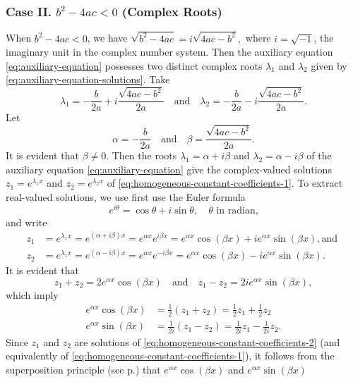  \subsubsection{Case II. \(b^2-4ac<0\) (Complex Roots)}
 When \(b^2-4ac<0\), we have \(\sqrt{b^2-4ac}= i\sqrt{4ac-b^2},\) where $i = \sqrt{-1}$,  the imaginary unit in the complex number system. Then the auxiliary equation \eqref{eq:auxiliary-equation}  possesses two distinct complex roots $\lambda_1$ and $\lambda_2$  given by  \eqref{eq:auxiliary-equation-solutions}. Take 
 \begin{equation}\label{eq:auxiliary-equation-solutions-complex}
 	\lambda_1= -\frac{b}{2a}+ i\frac{\sqrt{4ac-b^2}}{2a}
 \quad\mbox{and}\quad 
 	\lambda_2=-\frac{b}{2a}- i\frac{\sqrt{4ac-b^2}}{2a}.
 \end{equation}
  Let\[\alpha = -\frac{b}{2a} \quad \mbox{and}\quad \beta =\frac{\sqrt{4ac-b^2}}{2a}.\] It is evident that $\beta \ne 0.$ Then the roots $\lambda_1=\alpha+ i\beta$ and $\lambda_2=\alpha - i \beta$ of the auxiliary equation \eqref{eq:auxiliary-equation}  give the complex-valued solutions \(z_1=e^{\lambda_1x}\) and \(z_2=e^{\lambda_2x}\) of \eqref{eq:homogeneous-constant-coefficients-1}. To extract real-valued solutions, we use first use the Euler formula 
  \[e^{i\theta} = \cos \theta + i \sin \theta, \quad \theta \mbox{ in radian,}\]
  and write
  \[\begin{split}
  	z_1&=e^{\lambda_1x} = e^{(\alpha+ i\beta)x} = e^{\alpha x} e^{i\beta x} =e^{\alpha x} \cos(\beta x)+ ie^{\alpha x}\sin(\beta x), \mbox{and }\\
	 z_2&=e^{\lambda_1x} = e^{(\alpha- i\beta)x} = e^{\alpha x} e^{-i\beta x} =e^{\alpha x} \cos(\beta x)- ie^{\alpha x}\sin(\beta x).
  \end{split}\]
  It is evident that 
  \[z_1 + z_2 =2e^{\alpha x} \cos(\beta x) \quad\mbox{and}\quad z_1 - z_2 =2ie^{\alpha x} \sin(\beta x),\]
  which imply
  \[
  \begin{split}
  	e^{\alpha x} \cos(\beta x) &=\frac{1}{2}\left(z_1+z_2\right)= \frac{1}{2}z_1 + \frac{1}{2}z_2\\
  	e^{\alpha x} \sin(\beta x)&=\frac{1}{2i}\left(z_1-z_2\right)=\frac{1}{2i}z_1 - \frac{1}{2i}z_2.
  \end{split}\]
  Since $z_1$ and $z_2$ are solutions of \eqref{eq:homogeneous-constant-coefficients-2} (and equivalently of \eqref{eq:homogeneous-constant-coefficients-1}), it follows from 
 the superposition principle (see p.\pageref{superposition}) that \(e^{\alpha x} \cos(\beta x)\) and \(e^{\alpha x} \sin(\beta x)\)
